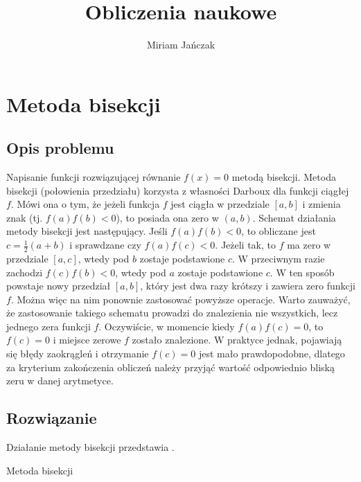 \documentclass[11pt]{mk-polish-lab-report}
\author{Miriam Jańczak}
\title{Obliczenia naukowe}
\begin{document}
\maketitle

\section{Metoda bisekcji}

\subsection{Opis problemu}
Napisanie funkcji rozwiązującej równanie $f(x) = 0$ metodą bisekcji. Metoda bisekcji (połowienia przedziału) korzysta z własności Darboux dla funkcji ciągłej $f$. Mówi ona o tym, że jeżeli funkcja $f$ jest ciągła w przedziale $[a, b]$ i zmienia znak (tj. $f(a)f(b)<0$), to posiada ona zero w $(a, b)$. Schemat działania metody bisekcji jest następujący. Jeśli $f(a)f(b) < 0$, to obliczane jest $c = \frac{1}{2}(a + b)$ i sprawdzane czy $f(a)f(c) < 0$. Jeżeli tak, to $f$ ma zero w przedziale $[a, c]$, wtedy pod $b$ zostaje podstawione $c$. W przeciwnym razie zachodzi $f(c)f(b) < 0$, wtedy pod $a$ zostaje podstawione $c$. W ten sposób powstaje nowy przedział $[a, b]$, który jest dwa razy krótszy i zawiera zero funkcji $f$. Można więc na nim ponownie zastosować powyższe operacje. Warto zauważyć, że zastosowanie takiego schematu prowadzi do znalezienia nie wszystkich, lecz jednego zera funkcji $f$. Oczywiście, w momencie kiedy $f(a)f(c) = 0$, to $f(c) = 0$ i miejsce zerowe $f$ zostało znalezione. W praktyce jednak, pojawiają się błędy zaokrągleń i otrzymanie $f(c) = 0$ jest mało prawdopodobne, dlatego za kryterium zakończenia obliczeń należy przyjąć wartość odpowiednio bliską zeru w danej arytmetyce. 

\subsection{Rozwiązanie}
Działanie metody bisekcji przedstawia .

\begin{algorithm}[!h]
\caption{Metoda bisekcji}
\label{alg:bis}
\DontPrintSemicolon
{}
\end{algorithm}
\end{document}
